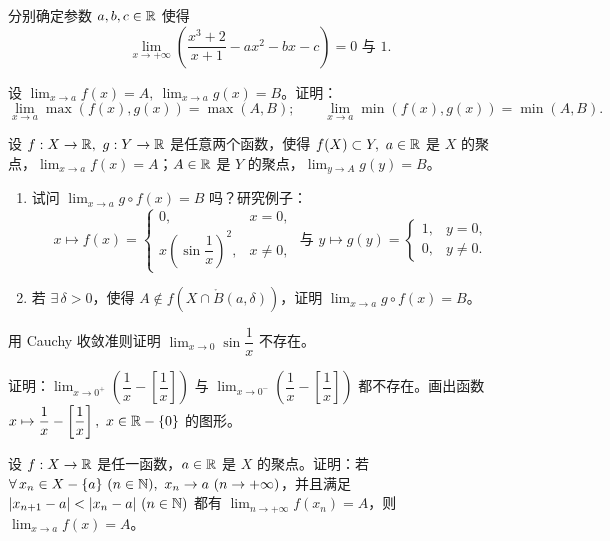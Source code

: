\begin{exercise}
	\item 分别确定参数 \(a,b,c\in\mathbb{R}\) 使得
	\[
	\lim_{x\to+\infty}\left(\frac{x^3+2}{x+1}-ax^2-bx-c\right)=0 \text{ 与 } 1.
	\]
\end{exercise}

\begin{exercise}
	\item 设 \(\lim_{x\to a}f(x)=A,\ \lim_{x\to a}g(x)=B\)。证明：
	\[
	\lim_{x\to a}\max(f(x),g(x))=\max(A,B);\qquad \lim_{x\to a}\min(f(x),g(x))=\min(A,B).
	\]
\end{exercise}

\begin{exercise}
	\item 设 \(f:X\to\mathbb{R},\ g:Y\to\mathbb{R}\) 是任意两个函数，使得 \(f(X)\subset Y,\ a\in\R\) 是 \(X\) 的聚点，\(\lim_{x\to a}f(x)=A\)；\(A\in\mathbb{R}\) 是 \(Y\) 的聚点，\(\lim_{y\to A}g(y)=B\)。
	\begin{enumerate}[label=\arabic*)]
		\item 试问 \(\lim_{x\to a}g\circ f(x)=B\) 吗？研究例子：
		\[
		x\longmapsto f(x)=\begin{cases} 0, & x=0, \\ x\left(\sin\dfrac1x\right)^2, & x\neq0, \end{cases}
		\text{ 与 }
		y\longmapsto g(y)=\begin{cases} 1, & y=0, \\ 0, & y\neq0. \end{cases}
		\]
		\item 若 \(\exists\,\delta>0\)，使得 \(A\notin f(X\cap\mathring{B}(a,\delta))\)，证明 \(\lim_{x\to a}g\circ f(x)=B\)。
	\end{enumerate}
\end{exercise}

\begin{exercise}
	\item 用 Cauchy 收敛准则证明 \(\lim_{x\to0}\sin\dfrac1x\) 不存在。
\end{exercise}

\begin{exercise}
	\item 证明：\(\lim_{x\to0^+}\left(\dfrac1x-\left[\dfrac1x\right]\right)\) 与 \(\lim_{x\to0^-}\left(\dfrac1x-\left[\dfrac1x\right]\right)\) 都不存在。画出函数 \(x\mapsto\dfrac1x-\left[\dfrac1x\right],\ x\in\R-\{0\}\) 的图形。
\end{exercise}

\begin{exercise}
	\item 设 \(f:X\to\mathbb{R}\) 是任一函数，\(a\in\mathbb{R}\) 是 \(X\) 的聚点。证明：若 \(\forall\,x_n\in X-\{a\}\ (n\in\N),\ x_n\to a\ (n\to+\infty)\)，并且满足 \(|x_{n+1}-a|<|x_n-a|\ (n\in\N)\) 都有 \(\lim_{n\to+\infty}f(x_n)=A\)，则 \(\lim_{x\to a}f(x)=A\)。
\end{exercise}

